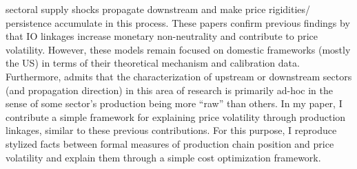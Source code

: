 sectoral supply shocks propagate downstream and make price rigidities/ persistence accumulate in this process. These papers confirm 
previous findings by \textcite{nakamura2010MonetaryNonneutralityMultisector} that IO linkages increase monetary non-neutrality and 
contribute to price volatility. However, these models remain focused on domestic frameworks (mostly the US) in terms of their 
theoretical mechanism and calibration data. Furthermore, \textcite{smets2019PipelinePressuresSectoral} admits that the 
characterization of upstream or downstream sectors (and propagation direction) in this area of research is primarily ad-hoc in the 
sense of some sector's production being more ``raw'' \parencite[27]{smets2019PipelinePressuresSectoral} than others. In my paper, 
I contribute a simple framework for explaining price volatility through production linkages, similar to these previous contributions.
For this purpose, I reproduce stylized facts between formal measures of production chain position and price volatility and explain them 
through a simple cost optimization framework.\\


